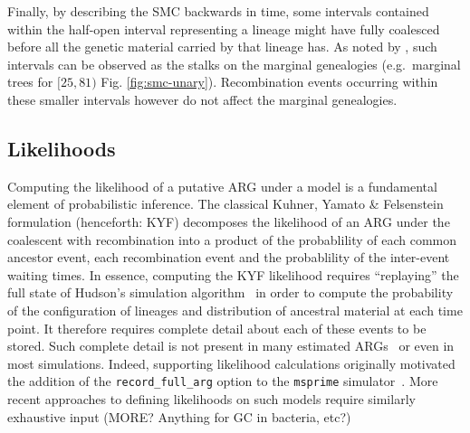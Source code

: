 \documentclass{article}
\begin{document}

Finally, by describing the SMC
backwards in time, some intervals contained within the half-open
interval representing a lineage might have fully coalesced before all the genetic
material carried by that lineage has. As noted by \citet{mcvean_approximating_2005},
such intervals can be observed as the stalks on the marginal genealogies (e.g.\ marginal trees
for $[25, 81)$ Fig. \ref{fig:smc-unary}). Recombination events occurring within these smaller
intervals however do not affect the marginal genealogies.



\subsection{Likelihoods} \label{par:liks}

Computing the likelihood of a putative ARG under a model is a fundamental element of
probabilistic inference. The classical Kuhner, Yamato \& Felsenstein
\citeyearpar{kuhner_maximum_2000} formulation (henceforth: KYF)
decomposes the likelihood of an ARG under the coalescent with recombination
into a product of the probablility of 
each common ancestor event, each recombination event and the probablility of
the inter-event waiting times. In essence, computing the KYF likelihood requires
``replaying'' the full state of Hudson's simulation
algorithm~\citep{hudson_properties_1983,kelleher_efficient_2016} in order to
compute the probability of the configuration of lineages and distribution
of ancestral material at each time point. It therefore requires complete
detail about each of these events to be stored. 
Such complete detail is not present in many estimated
ARGs~\citep{wong_general_2023} or even in most simulations.
Indeed, supporting likelihood calculations originally motivated the addition of
the \texttt{record\_full\_arg}
option to the \texttt{msprime} simulator~\citep{baumdicker_efficient_2021}.
More recent approaches to defining likelihoods on such models require
similarly exhaustive input\citep[e.g.][]{guo_recombination-aware_2022} (MORE?
Anything for GC in bacteria, etc?)
\end{document}
